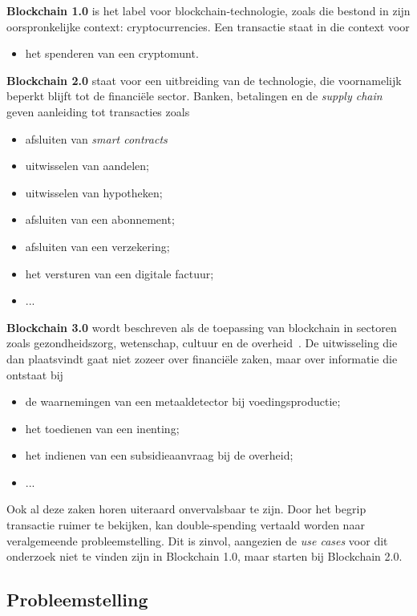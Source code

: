 \textbf{Blockchain 1.0} is het label voor blockchain-technologie, zoals die bestond in zijn oorspronkelijke context: cryptocurrencies. Een transactie staat in die context voor
\begin{itemize}
	\item het spenderen van een cryptomunt.
\end{itemize}
\textbf{Blockchain 2.0} staat voor een uitbreiding van de technologie, die voornamelijk beperkt blijft tot de financiële sector. Banken, betalingen en de \textit{supply chain} geven aanleiding tot transacties zoals
\begin{itemize}
	\item afsluiten van \textit{smart contracts}
	\item uitwisselen van aandelen;
	\item uitwisselen van hypotheken;
	\item afsluiten van een abonnement;
	\item afsluiten van een verzekering;
	\item het versturen van een digitale factuur;
	\item ...
\end{itemize}
\textbf{Blockchain 3.0} wordt beschreven als de toepassing van blockchain in sectoren zoals gezondheidszorg, wetenschap, cultuur en de overheid~\autocite{Xu2019}. De uitwisseling die dan plaatsvindt gaat niet zozeer over financiële zaken, maar over informatie die ontstaat bij
\begin{itemize}
	\item de waarnemingen van een metaaldetector bij voedingsproductie;
	\item het toedienen van een inenting;
	\item het indienen van een subsidieaanvraag bij de overheid;
	\item ...
\end{itemize}

Ook al deze zaken horen uiteraard onvervalsbaar te zijn. Door het begrip transactie ruimer te bekijken, kan double-spending vertaald worden naar veralgemeende probleemstelling. Dit is zinvol, aangezien de \textit{use cases} voor dit onderzoek niet te vinden zijn in Blockchain 1.0, maar starten bij Blockchain 2.0.


\subsection{Probleemstelling}
\label{sub:probleemstelling}

